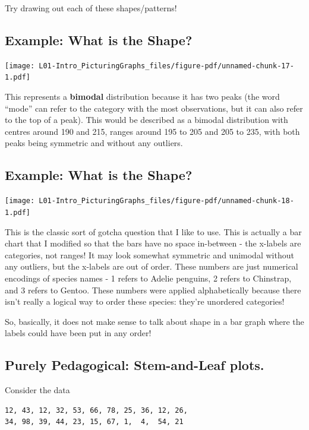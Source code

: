 \documentclass[
  letterpaper,
  DIV=11,
  numbers=noendperiod,
  oneside]{scrreprt}
\begin{document}
Try drawing out each of these shapes/patterns!

\hypertarget{example-what-is-the-shape}{%
\subsection{Example: What is the
Shape?}\label{example-what-is-the-shape}}

\texttt{[image: L01-Intro\_PicturingGraphs\_files/figure-pdf/unnamed-chunk-17-1.pdf]}

This represents a \textbf{bimodal} distribution because it has two peaks
(the word ``mode'' can refer to the category with the most observations,
but it can also refer to the top of a peak). This would be described as
a bimodal distribution with centres around 190 and 215, ranges around
195 to 205 and 205 to 235, with both peaks being symmetric and without
any outliers.

\hypertarget{example-what-is-the-shape-1}{%
\subsection{Example: What is the
Shape?}\label{example-what-is-the-shape-1}}

\texttt{[image: L01-Intro\_PicturingGraphs\_files/figure-pdf/unnamed-chunk-18-1.pdf]}

This is the classic sort of gotcha question that I like to use. This is
actually a bar chart that I modified so that the bars have no space
in-between - the x-labels are categories, not ranges! It may look
somewhat symmetric and unimodal without any outliers, but the x-labels
are out of order. These numbers are just numerical encodings of species
names - 1 refers to Adelie penguins, 2 refers to Chinstrap, and 3 refers
to Gentoo. These numbers were applied alphabetically because there isn't
really a logical way to order these species: they're unordered
categories!

So, basically, it does not make sense to talk about shape in a bar graph
where the labels could have been put in any order!

\hypertarget{purely-pedagogical-stem-and-leaf-plots.}{%
\subsection{Purely Pedagogical: Stem-and-Leaf
plots.}\label{purely-pedagogical-stem-and-leaf-plots.}}

Consider the data

\begin{verbatim}
12, 43, 12, 32, 53, 66, 78, 25, 36, 12, 26,
34, 98, 39, 44, 23, 15, 67, 1,  4,  54, 21
\end{verbatim}
\end{document}
